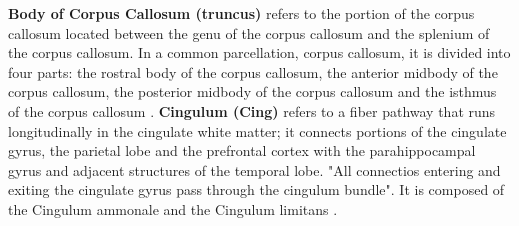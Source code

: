 \documentclass[../structure.tex]{subfiles}
\begin{document}
\textbf{Body of Corpus Callosum (truncus)} 
		 refers to the portion of the corpus callosum located between the genu of the corpus callosum and the splenium of the corpus callosum. In a common parcellation, corpus callosum, it is divided into four parts: the rostral body of the corpus callosum, the anterior midbody of the corpus callosum, the posterior midbody of the corpus callosum and the isthmus of the corpus callosum \cite{Washington1994}.
		\textbf{Cingulum (Cing)}
		refers to a fiber pathway that runs longitudinally in the cingulate white matter; it connects portions of the cingulate gyrus, the parietal lobe and the prefrontal cortex with the parahippocampal gyrus and adjacent structures of the temporal lobe. "All connectios entering and exiting the cingulate gyrus pass through the cingulum bundle". It is composed of the Cingulum ammonale and the Cingulum limitans \cite{Washington1994}.\\
		
\end{document}
